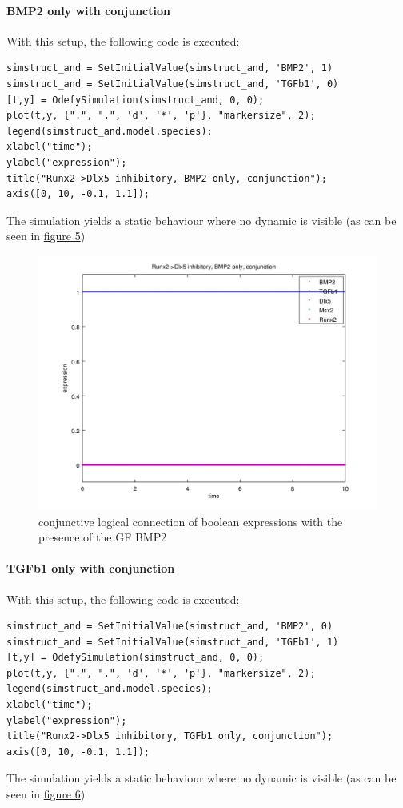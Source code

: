\documentclass[11pt]{article}
\begin{document}
\paragraph{BMP2 only with conjunction}
With this setup, the following code is executed:
\begin{lstlisting}
simstruct_and = SetInitialValue(simstruct_and, 'BMP2', 1)
simstruct_and = SetInitialValue(simstruct_and, 'TGFb1', 0)
[t,y] = OdefySimulation(simstruct_and, 0, 0);
plot(t,y, {".", ".", 'd', '*', 'p'}, "markersize", 2);
legend(simstruct_and.model.species);
xlabel("time");
ylabel("expression");
title("Runx2->Dlx5 inhibitory, BMP2 only, conjunction");
axis([0, 10, -0.1, 1.1]);
\end{lstlisting}
The simulation yields a static behaviour where no dynamic is visible (as can be seen in \hyperref[firstCase]{figure 5})
%
\begin{figure}[!htb]
	\centering
	\includegraphics[scale=0.55]{case1.jpg}
	\caption{\label{firstCase} conjunctive logical connection of boolean expressions with the presence of the GF BMP2}
\end{figure}

\paragraph{TGFb1 only with conjunction}
With this setup, the following code is executed:
\begin{lstlisting}
simstruct_and = SetInitialValue(simstruct_and, 'BMP2', 0)
simstruct_and = SetInitialValue(simstruct_and, 'TGFb1', 1)
[t,y] = OdefySimulation(simstruct_and, 0, 0);
plot(t,y, {".", ".", 'd', '*', 'p'}, "markersize", 2);
legend(simstruct_and.model.species);
xlabel("time");
ylabel("expression");
title("Runx2->Dlx5 inhibitory, TGFb1 only, conjunction");
axis([0, 10, -0.1, 1.1]);
\end{lstlisting}
The simulation yields a static behaviour where no dynamic is visible (as can be seen in \hyperref[secondCase]{figure 6})
\end{document}
